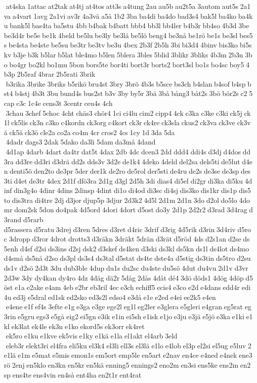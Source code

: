  at4ska 1attac at2tak at4tj at4tos att3s a4tung 2au au5b au2t5a 3autom aut5s 2a1va a4vart 1avg 2a1vi av3r 4a3vä a5å 1b2 3ba ba4di ba4do bad3s4 bak5l ba4ko ba4ku bank5l bas4ta ba5stu 4bb b4bak b4batt bbb4 bb3l bb4ler b4b3r bb4so 4b3d 3be be3d4r be5e be1k 4beld be5lu be3ly be3lå be5lö beng4 be3nå be1rö be1s be3sl bes5s be4sta be4ste be5su be3tr be3tv be3u 4bex 2b3f 2b5h 3bi bi3d4 4binv bis3ko bi5skv b3je b3k b5lar b5lat ble4mo b5len 5blera 3bles 5blid 3blikr 3bliks 4b3m 2b3n 3bo bo4gr bo2kl bo1mu 5bon bors5te bor4ti bort3r borts2 bort3sl bo1s bo4sc boy5 4b3p 2b5raf 4brar 2b5rati 3brik  b3rika 3brike 3briks b5rikö bru4st 3bry 3brö 4b3s b5sce bs3ch b4slan b4sof b4sp bst4 b4stj 4b3t 3bu bund4s bus2st b3v 3by by5r 3bä 3bå bång3 båt2s 3bö bör2s c2 5cap c3c 1c4e cens3t 3centr ceu4s 4ch  3chau 3chef 5choc 4cht chäs3 chör4 1ci ci4lu cim2 cipp4 4ck c3ka c3ke c3ki ck5j ck1l ck5lis ck3n c3ko c4kordn ck3org c4kort ck3r ck4re ck3sla ckus2 ck3va ck3ve ck3vä ck5ä ck3ö cle2a co2a co4m 4cr cros2 4cs 1cy 1d 3da 5da  4dadr dags3 2dak 5dako da3li 5dam da3må 4dand  4d1ap 4darb 4dart da4tr dat5t 4dax 2db 4dc dcen3 2dd ddd4 ddi4s d3dj d4dos dd3ra dd3re dd3ri d3drä dd2s dds3v 3d2e de1k4 4deko 4deld del2sa dels5ti de5lut d4en denti5ö den2to de3pr 5der der1k de2ro de5rol der5sti de4ru de2s de3se de3sp des3ti d4et de3tr 4dex 2d1f dfö3ra 2d1g d3gl 2d5h 3di dias4 di5el di2gr di3ka di5ku 4dinf din3g4o 4dinr 4dins 2dinsp 4dint di1o di4od di3sc di4sj dis3ko dis1kr dis1p dis5to dis3tra di4tre 2dj d3jor djup5p 3djur 2d3k2 4d5l 2d1m 2d1n 3do d2ol do5lo 4domr dom2sk 5don do4pak 4d5ord 4dori 4dort d5ost do3y 2d1p 2d2r2 d3rad 3d4rag d3rand d5rarb 	d5rassera d5ratu 3drej d3ren 5dres d3ret d4ric 3drif d3rig 4d5rik d3rin 3d4riv d5roc 3dropp d3ror 4drot drotts3 d3räkn 3dräkt 5drän d3rät d5röd 4ds d2s1an d2se ds5enh d4sf d2si ds3ins d2sj dsk2 d3skef ds4ken d3ski ds3kl ds5kn ds1l ds4lot ds4mo d4små ds5nå d2so ds3pl ds3s4 ds3tal d5stat ds4te dste4a d5stig ds3tin ds5tro d2su ds1v d2sö 2d3t 3du dub3ble 4dup du1s du2sc du4ste du5sö 4dut du4vu 2d1v d3vr 2d3w 3dy dy4kan dy4ro 4dz 4däg dä2r 5dåg 2dås 4dåt dé4 3dö döds1 4dög 4döp d5öst e1a e2ake e4am 4eb e2br eb3ril 4ec e3ch echiff5 ecis4 e3co e2d e4dans edd4r edi4u ed3j e5dral ed1sk ed2sko ed3s2l edso4 e3då e1e e2ed e4ei ee2k5 e4en  e4ene e1f ef4s 3efte e1g e3ga e3ge ege2l eg1l eg2ler e3glera e5gleri e4gran eg5rat eg3rin e5gru egs3 e5gå eig2 ei5gn e3ik e1in ei5sh e1isk e1jo e3ju e3jä e5jö e3ka e1ki e1kl ek3lat ek4le ek3n e1ko ekord5s ek3orr ek4ret  ek5ro e1ku e1kve ek5vis e1ky e1kä e1la el1akt el4arb 3eld  eleb3r elekt3ri el4fra eli5ku el3k4 el3li ell3s el3lä e1lo e4lob el3p el2si el5ug e5luv 2e1lä e1m e5mat e5mis emon1s em5ort emp5le en5art e2nav en4ce e4ned e4nek ene3rö 2enj en5klo en3kn en5kr en5kä enning5 ennings2 eno2m en3si ens5ke ens2m en2sp ens4te ens4vin en4så ent4ha en2t1r ent4rat 